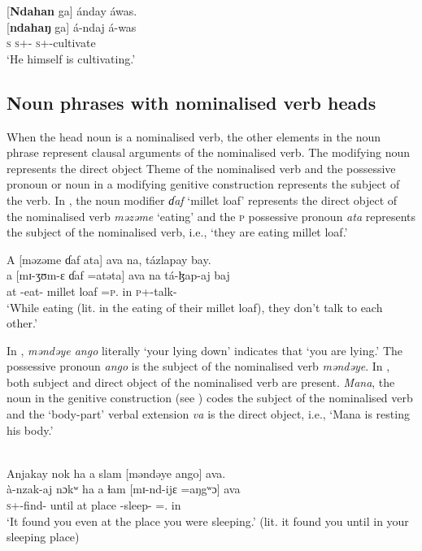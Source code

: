 \ea \label{ex:5:33}
{}[\textbf{Ndahan} ga]  ánday  áwas.\\
\gll  {}[\textbf{ndahaŋ}  ga]   á-ndaj  á-was\\
      \textsc{s}    {\ADJ}  \textsc{s}+{\IFV}-{\PROG}  \textsc{s}+{\IFV}-cultivate\\
\glt  ‘He himself is cultivating.’
\z

\subsection{Noun phrases with nominalised verb heads}\label{sec:5.2.1}
\hypertarget{RefHeading1211621525720847}{}
When the head noun is a nominalised verb, the other elements in the noun phrase represent clausal arguments of the nominalised verb. The modifying noun represents the direct object Theme of the nominalised verb and the possessive pronoun or noun in a modifying genitive construction represents the subject of the verb. In , the noun modifier \textit{ɗaf} ‘millet loaf’ represents the direct object of the nominalised verb \textit{məzəme} ‘eating’ and the \textsc{p} possessive pronoun \textit{ata} represents the subject of the nominalised verb, i.e., ‘they are eating millet loaf.’

\ea \label{ex:5:34}
A  [məzəme  ɗaf  ata]  ava  na,  tázlapay  bay.\\
\gll  a  [mɪ-ʒʊm-ɛ    ɗaf  =atəta]    ava  na  tá-ɮap-aj  baj\\
      at  {\NOM}{}-eat-{\CL}    {millet loaf}  =\textsc{p}.{\POSS}  in  {\PSP}  \textsc{p}+{\IFV}-talk-{\CL}  {\NEG}\\
\glt  ‘While eating (lit. in the eating of their millet loaf), they don’t talk to each other.’
\z

In , \textit{məndəye  ango} literally ‘your lying down’ indicates that ‘you are lying.’ The possessive pronoun \textit{ango} is the subject of the nominalised verb \textit{məndəye}. In , both subject and direct object of the nominalised verb are present. \textit{Mana}, the noun in the genitive construction (see ) codes the subject of the nominalised verb and the ‘body-part’ verbal extension \textit{va} is the direct object, i.e., ‘Mana is resting his body.’ 

\clearpage
\ea \label{ex:5:35}\\
Anjakay  nok ha  a  slam  [məndəye  ango]  ava.\\
\gll  à-nzak-aj        nɔkʷ ha   a   ɬam    [mɪ-nd-ijɛ =aŋgʷɔ]   ava\\
      \textsc{s}+{\PFV}-find{}-{\CL}  {\twoS}  until   at  place   {\NOM}{}-sleep{}-{\CL}  ={\twoS}.{\POSS}       in\\
\glt  ‘It found you even at the place you were sleeping.’ (lit. it found you until in your sleeping place)
\z


